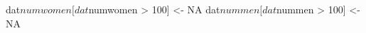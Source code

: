 \begin{Schunk}
\begin{Sinput}
 dat$numwomen[dat$numwomen > 100] <- NA
 dat$nummen[dat$nummen > 100] <- NA
\end{Sinput}
\end{Schunk}
